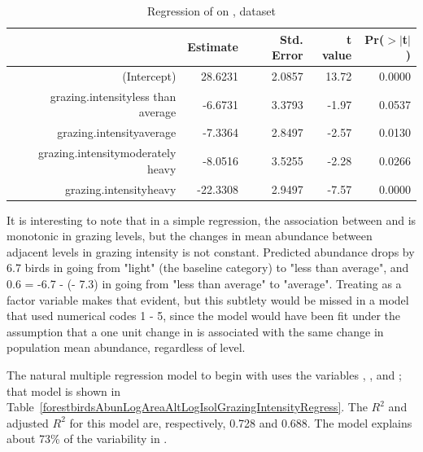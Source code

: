 \begin{table}[ht]
\centering
\begin{tabular}{rrrrr}
  \hline
 & Estimate & Std. Error & t value & Pr($>$$|$t$|$) \\ 
  \hline
(Intercept) & 28.6231 & 2.0857 & 13.72 & 0.0000 \\ 
  grazing.intensityless than average & -6.6731 & 3.3793 & -1.97 & 0.0537 \\ 
  grazing.intensityaverage & -7.3364 & 2.8497 & -2.57 & 0.0130 \\ 
  grazing.intensitymoderately heavy & -8.0516 & 3.5255 & -2.28 & 0.0266 \\ 
  grazing.intensityheavy & -22.3308 & 2.9497 & -7.57 & 0.0000 \\ 
   \hline
\end{tabular}
\caption{Regression of  on , dataset }
\label{forestbirdsAbunGrazingIntensityRegress}
\end{table}

It is interesting to note that in a simple regression, the association between  and  is monotonic in grazing levels, but the changes in mean abundance between adjacent levels in grazing intensity is not constant.  Predicted abundance drops by 6.7 birds in going from "light" (the baseline category) to "less than average", and 0.6 = -6.7 - (- 7.3) in going from "less than average" to "average".  Treating  as a factor variable makes that evident, but this subtlety would be missed in a model that used numerical codes 1 - 5, since the model would have been fit under the assumption that a one unit change in  is associated with the same change in population mean abundance, regardless of level. 

The natural multiple regression model to begin with uses the variables , ,  and ; that model is shown in Table~\ref{forestbirdsAbunLogAreaAltLogIsolGrazingIntensityRegress}.  The $R^2$ and adjusted $R^2$ for this model are, respectively, 0.728 and 0.688.  The model explains about 73\% of the variability in .  


